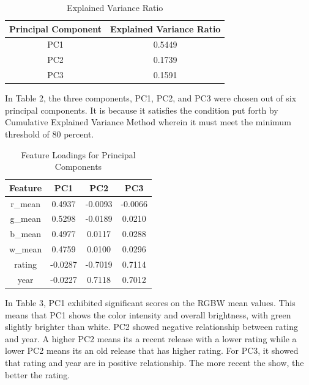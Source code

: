 \documentclass[conference]{IEEEtran}
\begin{document}
\begin{table}[h]
    \renewcommand{\arraystretch}{1.2}
    \centering
    \caption{Explained Variance Ratio}
    \label{tab:explained_variance}
    \begin{tabular}{cc}
        \hline
        \textbf{Principal Component} & \textbf{Explained Variance Ratio} \\
        \hline
        PC1 & 0.5449 \\
        PC2 & 0.1739 \\
        PC3 & 0.1591 \\
        \hline
    \end{tabular}
\end{table}


In Table 2, the three components, PC1, PC2, and PC3 were chosen out of six principal components. It is because it satisfies the condition put forth by Cumulative Explained Variance Method wherein it must meet the minimum threshold of 80 percent. 

\begin{table}[h]
    \renewcommand{\arraystretch}{1.2}
    \centering
    \caption{Feature Loadings for Principal Components}
    \label{tab:feature_loadings}
    \begin{tabular}{cccc}
        \hline
        \textbf{Feature} & \textbf{PC1} & \textbf{PC2} & \textbf{PC3} \\
        \hline
        r\_mean  &  0.4937  & -0.0093  & -0.0066  \\
        g\_mean  &  0.5298  & -0.0189  &  0.0210  \\
        b\_mean  &  0.4977  &  0.0117  &  0.0288  \\
        w\_mean  &  0.4759  &  0.0100  &  0.0296  \\
        rating   & -0.0287  & -0.7019  &  0.7114  \\
        year     & -0.0227  &  0.7118  &  0.7012  \\
        \hline
    \end{tabular}
\end{table}


In Table 3, PC1 exhibited significant scores on the RGBW mean values. This means that PC1 shows the color intensity and overall brightness, with green slightly brighter than white. PC2 showed negative relationship between rating and year. A higher PC2 means its a recent release with a lower rating while a lower PC2 means its an old release that has higher rating. For PC3, it showed that rating and year are in positive relationship. The more recent the show, the better the rating.
\end{document}
